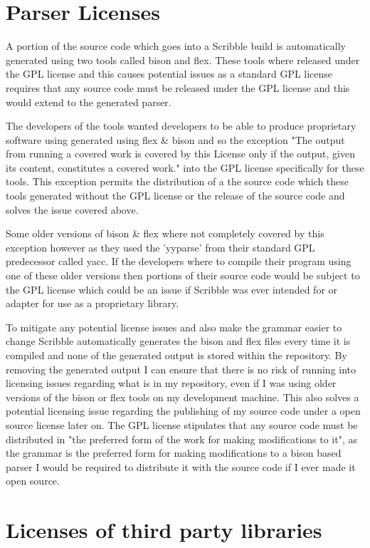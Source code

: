 \documentclass[]{final_report}
\begin{document}
\section{Parser Licenses}

A portion of the source code which goes into a Scribble build is automatically generated using two tools called bison and flex. These tools where released under the GPL license and this causes potential issues as a standard GPL license requires that any source code must be released under the GPL license and this would extend to the generated parser.

The developers of the tools wanted developers to be able to produce proprietary software using generated using flex \& bison and so the exception "The output from running a covered work is covered by this License only if the output, given its content, constitutes a covered work." into the GPL license specifically for these tools. This exception permits the distribution of a the source code which these tools generated without the GPL license or the release of the source code and solves the issue covered above.

Some older versions of bison \& flex where not completely covered by this exception however as they used the 'yyparse' from their standard GPL predecessor called yacc. If the developers where to compile their program using one of these older versions then portions of their source code would be subject to the GPL license which could be an issue if Scribble was ever intended for or adapter for use as a proprietary library.

To mitigate any potential license issues and also make the grammar easier to change Scribble automatically generates the bison and flex files every time it is compiled and none of the generated output is stored within the repository. By removing the generated output I can ensure that there is no risk of running into licensing issues regarding what is in my repository, even if I was using older versions of the bison or flex tools on my development machine. This also solves a potential licensing issue regarding the publishing of my source code under a open source license later on. The GPL license stipulates that any source code must be distributed in "the preferred form of the work for making modifications to it", as the grammar is the preferred form for making modifications to a bison based parser I would be required to distribute it with the source code if I ever made it open source.

\section{Licenses of third party libraries}
\end{document}
